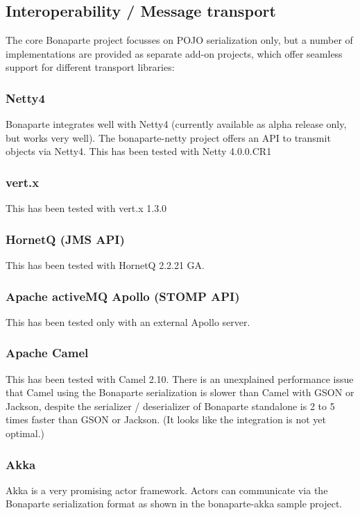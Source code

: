 \documentclass[11pt,a4paper,oneside]{article}
\begin{document}
\subsection{Interoperability / Message transport}
The core Bonaparte project focusses on POJO serialization only, but a number of implementations are provided as separate add-on projects, which offer seamless support for different transport libraries:

\subsubsection{Netty4}
Bonaparte integrates well with Netty4 (currently available as alpha release only, but works very well).
The bonaparte-netty project offers an API to transmit objects via Netty4.
This has been tested with Netty 4.0.0.CR1

\subsubsection{vert.x}
This has been tested with vert.x 1.3.0

\subsubsection{HornetQ (JMS API)}
This has been tested with HornetQ 2.2.21 GA.

\subsubsection{Apache activeMQ Apollo (STOMP API)}
This has been tested only with an external Apollo server.

\subsubsection{Apache Camel}
This has been tested with Camel 2.10. There is an unexplained performance issue that Camel using the Bonaparte serialization is slower than Camel with GSON or Jackson,
 despite the serializer / deserializer of Bonaparte standalone is 2 to 5 times faster than GSON or Jackson. (It looks like the integration is not yet optimal.)

\subsubsection{Akka}
Akka is a very promising actor framework. Actors can communicate via the Bonaparte serialization format as shown in the bonaparte-akka sample project.
\end{document}
